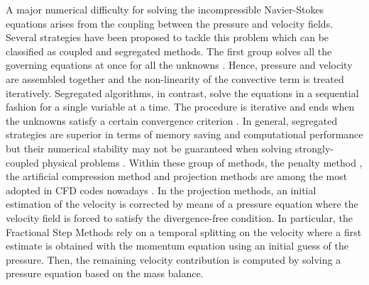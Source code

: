 \documentclass[final,3p,times,11pt,onecolumn]{myElsarticle}
\numberwithin{equation}{section}
\begin{document}
A major numerical difficulty for solving the incompressible Navier-Stokes equations arises from the coupling between
the pressure and velocity fields. Several strategies have been proposed to tackle this problem which can
be classified as coupled and segregated methods. The first group solves all the governing
equations at once for all the unknowns \cite{mazhar1, mazhar2, chen, darwish1, darwish2, uroic}. Hence, pressure and velocity are assembled together and the non-linearity of the convective term is treated iteratively. Segregated algorithms, in contrast, solve the equations in a sequential fashion for a single variable at a time. The procedure is iterative and ends when the unknowns satisfy a certain convergence criterion \cite{ferziger, versteeg, moukalled}. In general, segregated strategies are superior in terms of memory saving and computational performance but their numerical stability may not be guaranteed when solving strongly-coupled physical problems \cite{wang2, uroic}. Within these group of methods, the penalty method \cite{temam1968methode}, the artificial compression method \cite{harten1977artificial} and projection methods \cite{chorin1, chorin2, temam1968methode} are among the most adopted in CFD codes nowadays \cite{wang2}. In the projection methods, an initial estimation of the velocity is corrected by means of a pressure equation where the velocity field is forced to satisfy the divergence-free condition. In particular, the Fractional Step Methods \cite{kim} rely on a temporal splitting on the velocity where a first estimate is obtained with the momentum equation using an initial guess of the pressure. Then, the remaining velocity contribution is computed by solving a pressure equation based on the mass balance.
\end{document}
